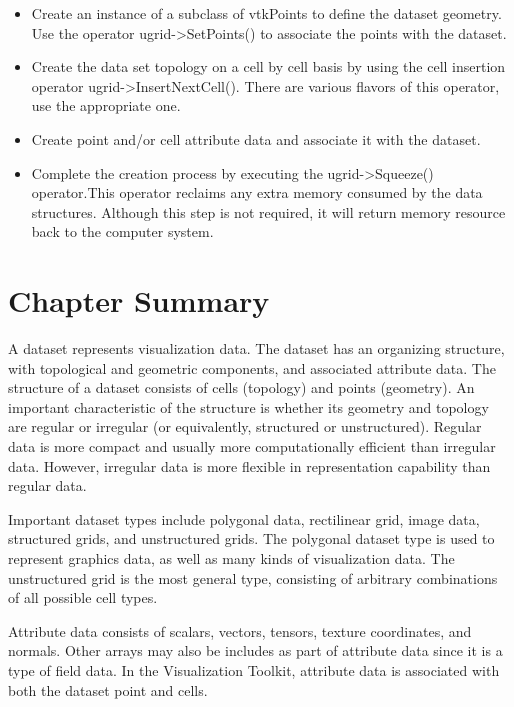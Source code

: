 \begin{description}[leftmargin=0cm,labelindent=0cm]
\begin{itemize}
	\item Create an instance of a subclass of vtkPoints to define the dataset geometry. Use the operator ugrid->SetPoints() to associate the points with the dataset.

	\item Create the data set topology on a cell by cell basis by using the cell insertion operator ugrid->InsertNextCell(). There are various flavors of this operator, use the appropriate one.

	\item Create point and/or cell attribute data and associate it with the dataset.

	\item Complete the creation process by executing the ugrid->Squeeze() operator.This operator reclaims any extra memory consumed by the data structures. Although this step is not required, it will return memory resource back to the computer system.

\end{itemize}

\end{description}

\section{Chapter Summary}

A dataset represents visualization data. The dataset has an organizing structure, with topological and geometric components, and associated attribute data. The structure of a dataset consists of cells (topology) and points (geometry). An important characteristic of the structure is whether its geometry and topology are regular or irregular (or equivalently, structured or unstructured). Regular data is more compact and usually more computationally efficient than irregular data. However, irregular data is more flexible in representation capability than regular data.

Important dataset types include polygonal data, rectilinear grid, image data, structured grids, and unstructured grids. The polygonal dataset type is used to represent graphics data, as well as many kinds of visualization data. The unstructured grid is the most general type, consisting of arbitrary combinations of all possible cell types.

Attribute data consists of scalars, vectors, tensors, texture coordinates, and normals. Other arrays may also be includes as part of attribute data since it is a type of field data. In the Visualization Toolkit, attribute data is associated with both the dataset point and cells.

